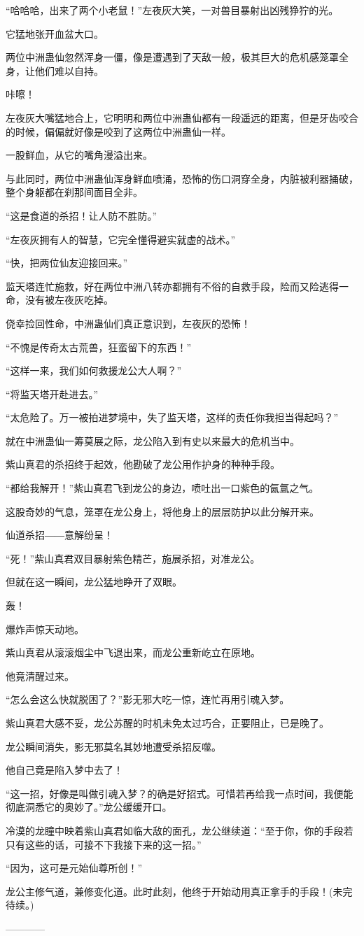 \begin{this_body}
“哈哈哈，出来了两个小老鼠！”左夜灰大笑，一对兽目暴射出凶残狰狞的光。

它猛地张开血盆大口。

两位中洲蛊仙忽然浑身一僵，像是遭遇到了天敌一般，极其巨大的危机感笼罩全身，让他们难以自持。

咔嚓！

左夜灰大嘴猛地合上，它明明和两位中洲蛊仙都有一段遥远的距离，但是牙齿咬合的时候，偏偏就好像是咬到了这两位中洲蛊仙一样。

一股鲜血，从它的嘴角漫溢出来。

与此同时，两位中洲蛊仙浑身鲜血喷涌，恐怖的伤口洞穿全身，内脏被利器捅破，整个身躯都在刹那间面目全非。

“这是食道的杀招！让人防不胜防。”

“左夜灰拥有人的智慧，它完全懂得避实就虚的战术。”

“快，把两位仙友迎接回来。”

监天塔连忙施救，好在两位中洲八转亦都拥有不俗的自救手段，险而又险逃得一命，没有被左夜灰吃掉。

侥幸捡回性命，中洲蛊仙们真正意识到，左夜灰的恐怖！

“不愧是传奇太古荒兽，狂蛮留下的东西！”

“这样一来，我们如何救援龙公大人啊？”

“将监天塔开赴进去。”

“太危险了。万一被拍进梦境中，失了监天塔，这样的责任你我担当得起吗？”

就在中洲蛊仙一筹莫展之际，龙公陷入到有史以来最大的危机当中。

紫山真君的杀招终于起效，他勘破了龙公用作护身的种种手段。

“都给我解开！”紫山真君飞到龙公的身边，喷吐出一口紫色的氤氲之气。

这股奇妙的气息，笼罩在龙公身上，将他身上的层层防护以此分解开来。

仙道杀招――意解纷呈！

“死！”紫山真君双目暴射紫色精芒，施展杀招，对准龙公。

但就在这一瞬间，龙公猛地睁开了双眼。

轰！

爆炸声惊天动地。

紫山真君从滚滚烟尘中飞退出来，而龙公重新屹立在原地。

他竟清醒过来。

“怎么会这么快就脱困了？”影无邪大吃一惊，连忙再用引魂入梦。

紫山真君大感不妥，龙公苏醒的时机未免太过巧合，正要阻止，已是晚了。

龙公瞬间消失，影无邪莫名其妙地遭受杀招反噬。

他自己竟是陷入梦中去了！

“这一招，好像是叫做引魂入梦？的确是好招式。可惜若再给我一点时间，我便能彻底洞悉它的奥妙了。”龙公缓缓开口。

冷漠的龙瞳中映着紫山真君如临大敌的面孔，龙公继续道：“至于你，你的手段若只有这些的话，可接不下我接下来的这一招。”

“因为，这可是元始仙尊所创！”

龙公主修气道，兼修变化道。此时此刻，他终于开始动用真正拿手的手段！(未完待续。)

------------

\end{this_body}

